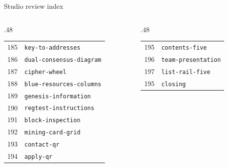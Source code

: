 \documentclass[aspectratio=169]{beamer}
\begin{document}
\begin{frame}{Studio review index}\fontsize{6.5}{9}\selectfont\begin{columns}[T]
\begin{column}{.48\textwidth}\begin{tabular}{rl}
185 & \texttt{key-to-addresses} \\
186 & \texttt{dual-consensus-diagram} \\
187 & \texttt{cipher-wheel} \\
188 & \texttt{blue-resources-columns} \\
189 & \texttt{genesis-information} \\
190 & \texttt{regtest-instructions} \\
191 & \texttt{block-inspection} \\
192 & \texttt{mining-card-grid} \\
193 & \texttt{contact-qr} \\
194 & \texttt{apply-qr} \\
\end{tabular}\end{column}
\begin{column}{.48\textwidth}\begin{tabular}{rl}
195 & \texttt{contents-five} \\
196 & \texttt{team-presentation} \\
197 & \texttt{list-rail-five} \\
195 & \texttt{closing} \\
\end{tabular}\end{column}
\end{columns}\end{frame}
\end{document}

